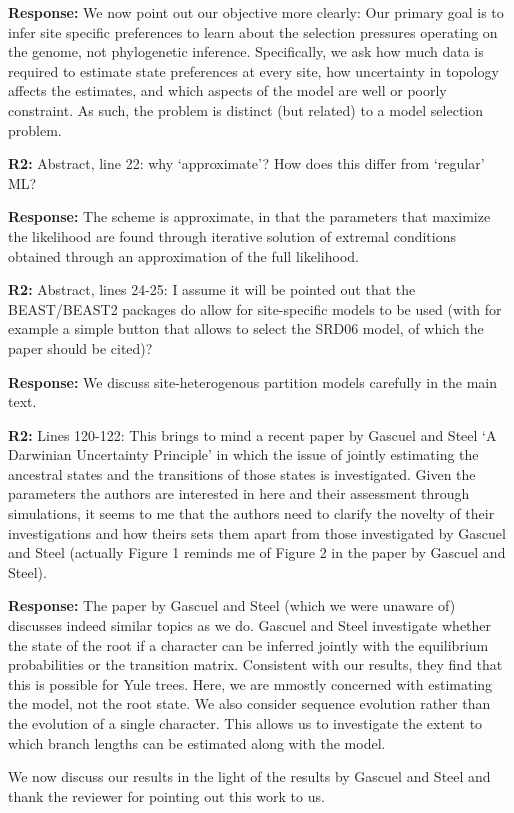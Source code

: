 \documentclass[aps,rmp,onecolumn]{revtex4-1}
\newcommand{\refb}[1]{\textbf{R2:} #1}
\newcommand{\response}[1]{{\color{black}\textbf{Response:} #1}}
\begin{document}
\response{
We now point out our objective more clearly: Our primary goal is to infer site specific preferences to learn about the selection pressures operating on the genome, not phylogenetic inference.
Specifically, we ask how much data is required to estimate state preferences at every site, how uncertainty in topology affects the estimates, and which aspects of the model are well or poorly constraint.
As such, the problem is distinct (but related) to a model selection problem.
}

\refb{Abstract, line 22: why ‘approximate’? How does this differ from ‘regular’ ML?}

\response{The scheme is approximate, in that the parameters that maximize the likelihood are found through iterative solution of extremal conditions obtained through an approximation of the full likelihood. }

\refb{Abstract, lines 24-25: I assume it will be pointed out that the BEAST/BEAST2 packages do allow for site-specific models to be used (with for example a simple button that allows to select the SRD06 model, of which the paper should be cited)?}

\response{We discuss site-heterogenous partition models carefully in the main text.}


\refb{Lines 120-122: This brings to mind a recent paper by Gascuel and Steel ‘A Darwinian Uncertainty Principle’ in which the issue of jointly estimating the ancestral states and the transitions of those states is investigated. Given the parameters the authors are interested in here and their assessment through simulations, it seems to me that the authors need to clarify the novelty of their investigations and how theirs sets them apart from those investigated by Gascuel and Steel (actually Figure 1 reminds me of Figure 2 in the paper by Gascuel and Steel).}

\response{The paper by Gascuel and Steel (which we were unaware of) discusses indeed similar topics as we do. Gascuel and Steel investigate whether the state of the root if a character can be inferred jointly with the equilibrium probabilities or the transition matrix. Consistent with our results, they find that this is possible for Yule trees.
Here, we are mmostly concerned with estimating the model, not the root state.
We also consider sequence evolution rather than the evolution of a single character.
This allows us to investigate the extent to which branch lengths can be estimated along with the model.

We now discuss our results in the light of the results by Gascuel and Steel and thank the reviewer for pointing out this work to us.
}
\end{document}
